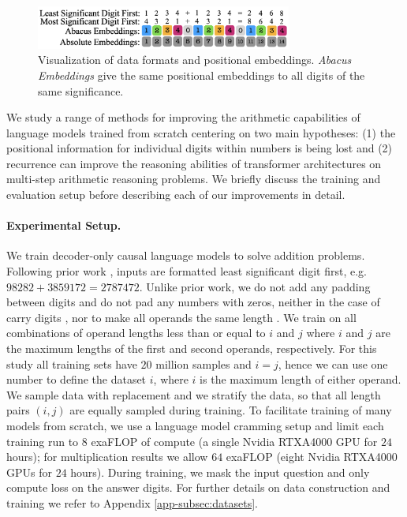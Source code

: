 \documentclass{article}
\begin{document}
\begin{figure}[t] %
    \centering
    \includegraphics[width=0.75\textwidth]{Figures/data.001.png}
    \caption{
    Visualization of data formats and positional embeddings.
    \textit{Abacus Embeddings} give the same positional embeddings to all digits of the same significance.
    }
    \label{fig:data}
    \vspace{-0.5cm}
\end{figure}

We study a range of methods for improving the arithmetic capabilities of language models trained from scratch centering on two main hypotheses: (1) the positional information for individual digits within numbers is being lost and (2) recurrence can improve the reasoning abilities of transformer architectures on multi-step arithmetic reasoning problems.
We briefly discuss the training and evaluation setup before describing each of our improvements in detail.

\paragraph{Experimental Setup.}
We train decoder-only causal language models to solve addition problems. Following prior work \citep{zhou2023algorithms,zhou2024transformers,shen2023positional,kazemnejad2023impact,lee2023teaching}, inputs are formatted least significant digit first, 
e.g. \(98282 + 3859172 = 2787472\).
Unlike prior work, we do not add any padding between digits \citep{shen2023positional} and do not pad any numbers with zeros, neither in the case of carry digits \citep{zhou2024transformers}, nor to make all operands the same length \citep{shen2023positional}.  
We train on all combinations of operand lengths less than or equal to $i$ and $j$ where \(i\) and \(j\) are the maximum lengths of the first and second operands, respectively.
For this study all training sets have \(20\) million samples and \(i=j\), hence we can use one number to define the dataset \(i\), where \(i\) is the maximum length of either operand. 
We sample data with replacement and we stratify the data, so that all length pairs $(i,j)$ are equally sampled during training.
To facilitate training of many models from scratch, we use a language model cramming setup \citep{geiping2023cramming} and limit each training run to $8$ exaFLOP of compute (a single Nvidia RTXA4000 GPU for $24$ hours); for multiplication results we allow $64$ exaFLOP (eight Nvidia RTXA4000 GPUs for $24$ hours). 
During training, we mask the input question and only compute loss on the answer digits. For further details on data construction and training we refer to Appendix \ref{app-subsec:datasets}.
 
\end{document}

